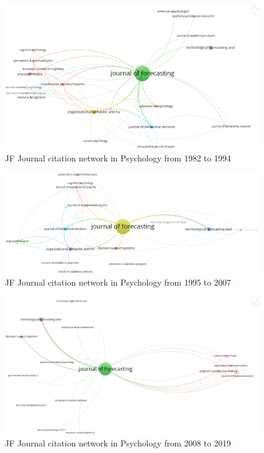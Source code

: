\documentclass[11pt,a4paper]{elsarticle} %
\begin{document}
\begin{figure}[htbp]
\centering
\includegraphics[scale=0.3]{fig.32.eps}
\caption{JF Journal citation network in Psychology from 1982 to 1994}
\end{figure}

\begin{figure}[htbp]
\centering
\includegraphics[scale=0.3]{fig.33.eps}
\caption{JF Journal citation network in Psychology from 1995 to 2007}
\end{figure}

\begin{figure}[htbp]
\centering
\includegraphics[scale=0.3]{fig.34.eps}
\caption{ JF Journal citation network in Psychology from 2008 to 2019}
\end{figure}
\end{document}
